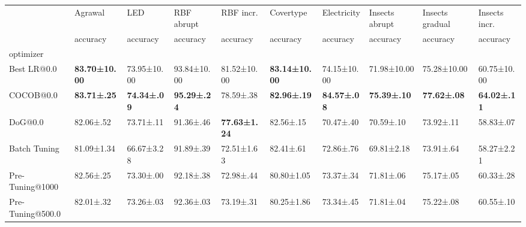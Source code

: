\begin{tabular}{llllllllll}
    \toprule
                     & Agrawal               & LED                 & RBF abrupt          & RBF incr.            & Covertype             & Electricity         & Insects abrupt      & Insects gradual     & Insects incr.       \\
                     & accuracy              & accuracy            & accuracy            & accuracy             & accuracy              & accuracy            & accuracy            & accuracy            & accuracy            \\
    optimizer        &                       &                     &                     &                      &                       &                     &                     &                     &                     \\
    \midrule
    Best LR@0.0      & \bfseries 83.70±10.00 & 73.95±10.00         & 93.84±10.00         & 81.52±10.00          & \bfseries 83.14±10.00 & 74.15±10.00         & 71.98±10.00         & 75.28±10.00         & 60.75±10.00         \\
    COCOB@0.0        & \bfseries 83.71±.25   & \bfseries 74.34±.09 & \bfseries 95.29±.24 & 78.59±.38            & \bfseries 82.96±.19   & \bfseries 84.57±.08 & \bfseries 75.39±.10 & \bfseries 77.62±.08 & \bfseries 64.02±.11 \\
    DoG@0.0          & 82.06±.52             & 73.71±.11           & 91.36±.46           & \bfseries 77.63±1.24 & 82.56±.15             & 70.47±.40           & 70.59±.10           & 73.92±.11           & 58.83±.07           \\
    Batch Tuning     & 81.09±1.34            & 66.67±3.28          & 91.89±.39           & 72.51±1.63           & 82.41±.61             & 72.86±.76           & 69.81±2.18          & 73.91±.64           & 58.27±2.21          \\
    Pre-Tuning@1000  & 82.56±.25             & 73.30±.00           & 92.18±.38           & 72.98±.44            & 80.80±1.05            & 73.37±.34           & 71.81±.06           & 75.17±.05           & 60.33±.28           \\
    Pre-Tuning@500.0 & 82.01±.32             & 73.26±.03           & 92.36±.03           & 73.19±.31            & 80.25±1.86            & 73.34±.45           & 71.81±.04           & 75.22±.08           & 60.55±.10           \\
    \bottomrule
\end{tabular}
